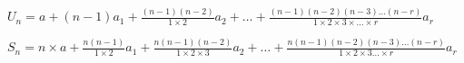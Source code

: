 \par\noindent$U_n = a + (n - 1) a_1 + \frac{(n - 1) (n - 2)}{1 \times 2} a_2 + \ldots + \frac{(n - 1) (n - 2) (n - 3) \ldots (n - r)}{1 \times 2 \times 3 \times \ldots \times r} a_r$
\newline
\par\noindent$S_n = n \times a + \frac{n(n - 1)}{1 \times 2} a_1 + \frac{n (n - 1) (n - 2)}{1 \times 2 \times 3} a_2 + \ldots + \frac{n(n-1)(n-2)(n-3)\ldots(n-r)}{1\times2\times3\ldots\times r} a_r$

